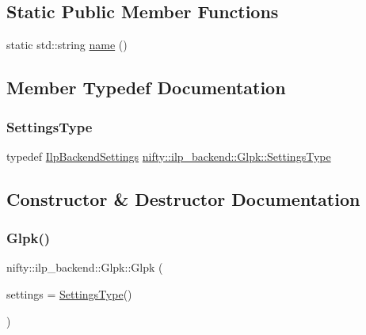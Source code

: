\subsection*{Static Public Member Functions}
\begin{DoxyCompactItemize}
\item 
static std\+::string \hyperlink{classnifty_1_1ilp__backend_1_1Glpk_ad86a2c29a1b0c73a47c79d2d5c0ff07d}{name} ()
\end{DoxyCompactItemize}


\subsection{Member Typedef Documentation}
\mbox{\label{classnifty_1_1ilp__backend_1_1Glpk_a8f3191eb733e6a2f08f82adceae32365}} 
\subsubsection{\texorpdfstring{Settings\+Type}{SettingsType}}
{\footnotesize\ttfamily typedef \hyperlink{structnifty_1_1ilp__backend_1_1IlpBackendSettings}{Ilp\+Backend\+Settings} \hyperlink{classnifty_1_1ilp__backend_1_1Glpk_a8f3191eb733e6a2f08f82adceae32365}{nifty\+::ilp\+\_\+backend\+::\+Glpk\+::\+Settings\+Type}}



\subsection{Constructor \& Destructor Documentation}
\mbox{\label{classnifty_1_1ilp__backend_1_1Glpk_a31b71a008ab6c3c16e60a17fbfc8822d}} 
\subsubsection{\texorpdfstring{Glpk()}{Glpk()}}
{\footnotesize\ttfamily nifty\+::ilp\+\_\+backend\+::\+Glpk\+::\+Glpk (\begin{DoxyParamCaption}\item[{const \hyperlink{classnifty_1_1ilp__backend_1_1Glpk_a8f3191eb733e6a2f08f82adceae32365}{Settings\+Type} \&}]{settings = {\ttfamily \hyperlink{classnifty_1_1ilp__backend_1_1Glpk_a8f3191eb733e6a2f08f82adceae32365}{Settings\+Type}()} }\end{DoxyParamCaption})\hspace{0.3cm}{\ttfamily [inline]}}

